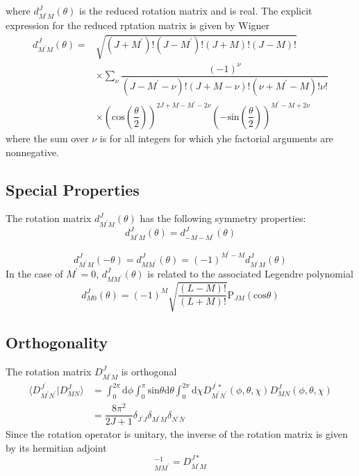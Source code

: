 \documentclass[]{article}
\begin{document}
where $d^J_{M^\prime M}(\theta)$ is the reduced rotation matrix and is real. The explicit expression for the reduced rptation matrix is given by Wigner
\begin{align}
	d^J_{M^\prime M}(\theta)=&\sqrt{(J+M^\prime)!(J-M^\prime)!(J+M)!(J-M)!}\nonumber\\
	&\times\sum\limits_\nu\dfrac{(-1)^\nu}{(J-M^\prime-\nu)!(J+M-\nu)!(\nu+M^\prime-M)!\nu!}\nonumber\\
	&\times\left( \mathrm{cos}\left( \dfrac{\theta}{2}\right) \right) ^{2J+M-M^\prime-2\nu}\left( -\mathrm{sin}\left( \dfrac{\theta}{2}\right) \right) ^{M^\prime-M+2\nu}
\end{align}
where the sum over $\nu$ is for all integers for which yhe factorial arguments are nonnegative.
\subsection{Special Properties}
The rotation matrix $d^J_{M^\prime M}(\theta)$ has the following symmetry properties:
\begin{equation}
	d^J_{M^\prime M}(\theta)=d^J_{-M-M^\prime}(\theta)
\end{equation}

\begin{equation}
	d^J_{M^\prime M}(-\theta)=d^J_{MM^\prime}(\theta)=(-1)^{M^\prime-M}d^J_{M^\prime M}(\theta)
\end{equation}
In the case of $M^\prime=0$, $d^J_{MM^\prime}(\theta)$ is related to the associated Legendre polynomial
\begin{equation}
	d^J_{M0}(\theta)=(-1)^M\sqrt{\dfrac{(L-M)!}{(L+M)!}}\mathrm{P}_{JM}(\mathrm{cos}\theta)
\end{equation}
\subsection{Orthogonality}
The rotation matrix $D^J_{M^\prime M}$ is orthogonal
\begin{align}
	\langle D^{J^\prime}_{M^\prime N^\prime}|D^J_{MN}\rangle&=\int_0^{2\pi}\mathrm{d}\phi\int_0^\pi\mathrm{sin}\theta\mathrm{d}\theta\int_0^{2\pi}\mathrm{d}\chi D^{J^\prime*}_{M^\prime N^\prime}(\phi,\theta,\chi)D^J_{MN}(\phi,\theta,\chi)\nonumber\\
	&=\dfrac{8\pi^2}{2J+1}\delta_{J^\prime J}\delta_{M^\prime M}\delta_{N^\prime N}
\end{align}
Since the rotation operator is unitary, the inverse of the rotation matrix is given by its hermitian adjoint
\begin{equation}
	[D^J]^{-1}_{MM^\prime}=D^{J*}_{M^\prime M}
\end{equation}
\end{document}
